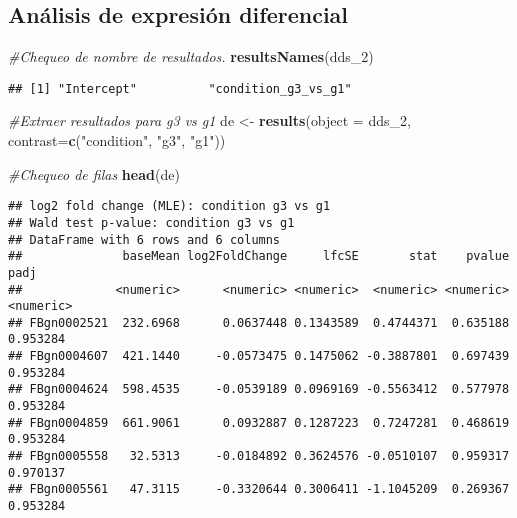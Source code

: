 \documentclass[
]{article}
\newenvironment{Shaded}{\begin{snugshade}}{\end{snugshade}}
\newcommand{\AttributeTok}[1]{\textcolor[rgb]{0.13,0.29,0.53}{#1}}
\newcommand{\CommentTok}[1]{\textcolor[rgb]{0.56,0.35,0.01}{\textit{#1}}}
\newcommand{\FunctionTok}[1]{\textcolor[rgb]{0.13,0.29,0.53}{\textbf{#1}}}
\newcommand{\NormalTok}[1]{#1}
\newcommand{\OtherTok}[1]{\textcolor[rgb]{0.56,0.35,0.01}{#1}}
\newcommand{\StringTok}[1]{\textcolor[rgb]{0.31,0.60,0.02}{#1}}
\begin{document}
\subsection{Análisis de expresión
diferencial}\label{anuxe1lisis-de-expresiuxf3n-diferencial-1}

\begin{Shaded}
\begin{Highlighting}[]
\CommentTok{\#Chequeo de nombre de resultados.}
\FunctionTok{resultsNames}\NormalTok{(dds\_2)}
\end{Highlighting}
\end{Shaded}

\begin{verbatim}
## [1] "Intercept"          "condition_g3_vs_g1"
\end{verbatim}

\begin{Shaded}
\begin{Highlighting}[]
\CommentTok{\#Extraer resultados para g3 vs g1}
\NormalTok{de }\OtherTok{\textless{}{-}} \FunctionTok{results}\NormalTok{(}\AttributeTok{object =}\NormalTok{ dds\_2, }\AttributeTok{contrast=}\FunctionTok{c}\NormalTok{(}\StringTok{"condition"}\NormalTok{, }\StringTok{"g3"}\NormalTok{, }\StringTok{"g1"}\NormalTok{))}

\CommentTok{\#Chequeo de filas}
\FunctionTok{head}\NormalTok{(de)}
\end{Highlighting}
\end{Shaded}

\begin{verbatim}
## log2 fold change (MLE): condition g3 vs g1 
## Wald test p-value: condition g3 vs g1 
## DataFrame with 6 rows and 6 columns
##              baseMean log2FoldChange     lfcSE       stat    pvalue      padj
##             <numeric>      <numeric> <numeric>  <numeric> <numeric> <numeric>
## FBgn0002521  232.6968      0.0637448 0.1343589  0.4744371  0.635188  0.953284
## FBgn0004607  421.1440     -0.0573475 0.1475062 -0.3887801  0.697439  0.953284
## FBgn0004624  598.4535     -0.0539189 0.0969169 -0.5563412  0.577978  0.953284
## FBgn0004859  661.9061      0.0932887 0.1287223  0.7247281  0.468619  0.953284
## FBgn0005558   32.5313     -0.0184892 0.3624576 -0.0510107  0.959317  0.970137
## FBgn0005561   47.3115     -0.3320644 0.3006411 -1.1045209  0.269367  0.953284
\end{verbatim}
\end{document}
